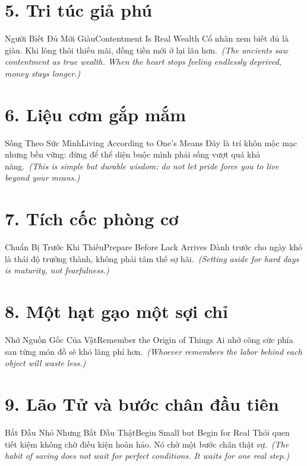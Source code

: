 \section*{5. Tri túc giả phú}
\begin{truyen}{Người Biết Đủ Mới Giàu}{Contentment Is Real Wealth}
Cổ nhân xem biết đủ là giàu. Khi lòng thôi thiếu mãi, đồng tiền mới ở lại lâu hơn.\
\textit{(The ancients saw contentment as true wealth. When the heart stops feeling endlessly deprived, money stays longer.)}
\end{truyen}

\section*{6. Liệu cơm gắp mắm}
\begin{truyen}{Sống Theo Sức Mình}{Living According to One’s Means}
Đây là trí khôn mộc mạc nhưng bền vững: đừng để thể diện buộc mình phải sống vượt quá khả năng.\
\textit{(This is simple but durable wisdom: do not let pride force you to live beyond your means.)}
\end{truyen}

\section*{7. Tích cốc phòng cơ}
\begin{truyen}{Chuẩn Bị Trước Khi Thiếu}{Prepare Before Lack Arrives}
Dành trước cho ngày khó là thái độ trưởng thành, không phải tâm thế sợ hãi.\
\textit{(Setting aside for hard days is maturity, not fearfulness.)}
\end{truyen}

\section*{8. Một hạt gạo một sợi chỉ}
\begin{truyen}{Nhớ Nguồn Gốc Của Vật}{Remember the Origin of Things}
Ai nhớ công sức phía sau từng món đồ sẽ khó lãng phí hơn.\
\textit{(Whoever remembers the labor behind each object will waste less.)}
\end{truyen}

\section*{9. Lão Tử và bước chân đầu tiên}
\begin{truyen}{Bắt Đầu Nhỏ Nhưng Bắt Đầu Thật}{Begin Small but Begin for Real}
Thói quen tiết kiệm không chờ điều kiện hoàn hảo. Nó chờ một bước chân thật sự.\
\textit{(The habit of saving does not wait for perfect conditions. It waits for one real step.)}
\end{truyen}

